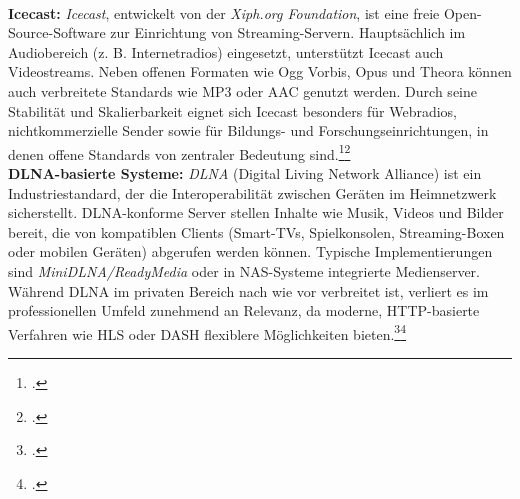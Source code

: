 \documentclass[12pt,a4paper]{report}
\begin{document}
  \\
  \newline
  \textbf{Icecast:}
  \emph{Icecast}, entwickelt von der \emph{Xiph.org Foundation}, ist eine freie Open-Source-Software zur Einrichtung von Streaming-Servern. 
  Hauptsächlich im Audiobereich (z. B. Internetradios) eingesetzt, unterstützt Icecast auch Videostreams. 
  Neben offenen Formaten wie Ogg Vorbis, Opus und Theora können auch verbreitete Standards wie MP3 oder AAC genutzt werden. 
  Durch seine Stabilität und Skalierbarkeit eignet sich Icecast besonders für Webradios, nichtkommerzielle Sender sowie für Bildungs- und Forschungseinrichtungen, 
  in denen offene Standards von zentraler Bedeutung sind.\footcite[Vgl.][]{wikipedia_icecast}\footcite[Vgl.][]{icecast_docs}  
  \\
  \newline
  \textbf{DLNA-basierte Systeme:}
  \emph{DLNA} (Digital Living Network Alliance) ist ein Industriestandard, der die Interoperabilität zwischen Geräten im Heimnetzwerk sicherstellt. 
  DLNA-konforme Server stellen Inhalte wie Musik, Videos und Bilder bereit, die von kompatiblen Clients 
  (Smart-TVs, Spielkonsolen, Streaming-Boxen oder mobilen Geräten) abgerufen werden können. 
  Typische Implementierungen sind \emph{MiniDLNA/ReadyMedia} oder in NAS-Systeme integrierte Medienserver. 
  Während DLNA im privaten Bereich nach wie vor verbreitet ist, verliert es im professionellen Umfeld zunehmend an Relevanz, da moderne, HTTP-basierte Verfahren wie HLS oder DASH flexiblere Möglichkeiten bieten.\footcite[Vgl.][]{wikipedia_dlna}\footcite[Vgl.][]{dlna_specs} 
\end{document}
